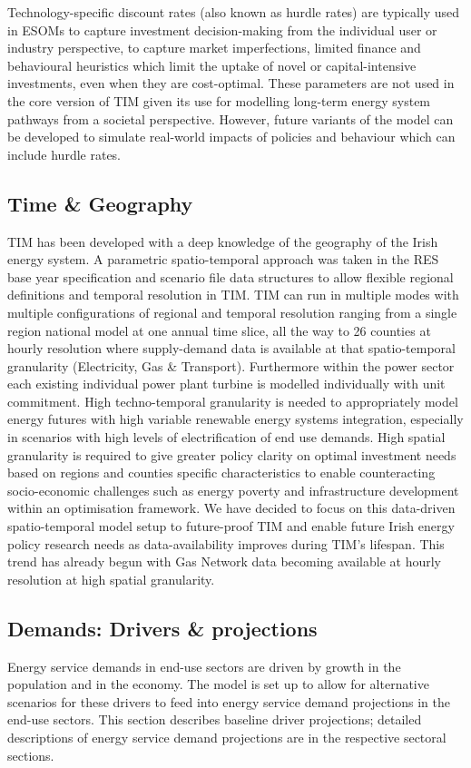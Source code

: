 \documentclass[gmd,manuscript]{copernicus}
\begin{document}
Technology-specific discount rates (also known as hurdle rates) are typically used in ESOMs to capture investment decision-making from the individual user or industry perspective, to capture market imperfections, limited finance and behavioural heuristics which limit the uptake of novel or capital-intensive investments, even when they are cost-optimal. These parameters are not used in the core version of TIM given its use for modelling long-term energy system pathways from a societal perspective. However, future variants of the model can be developed to simulate real-world impacts of policies and behaviour which can include hurdle rates. 

\subsection{Time \& Geography}
\label{ss:time_geo}
TIM has been developed with a deep knowledge of the geography of the Irish energy system. A parametric spatio-temporal approach was taken in the RES base year specification and scenario file data structures to allow flexible regional definitions and temporal resolution in TIM. TIM can run in multiple modes with multiple configurations of regional and temporal resolution ranging from a single region national model at one annual time slice, all the way to 26 counties at hourly resolution where supply-demand data is available at that spatio-temporal granularity (Electricity, Gas \& Transport). Furthermore within the power sector each existing individual power plant turbine is modelled individually with unit commitment. High techno-temporal granularity is needed to appropriately model energy futures with high variable renewable energy systems integration, especially in scenarios with high levels of electrification of end use demands. High spatial granularity is required to give greater policy clarity on optimal investment needs based on regions and counties specific characteristics to enable counteracting socio-economic challenges such as energy poverty and infrastructure development within an optimisation framework. We have decided to focus on this data-driven spatio-temporal model setup to future-proof TIM and enable future Irish energy policy research needs as data-availability improves during TIM's lifespan. This trend has already begun with Gas Network data becoming available at hourly resolution at high spatial granularity.

\subsection{Demands: Drivers \& projections}
\label{ss:model_proj}
Energy service demands in end-use sectors are driven by growth in the population and in the economy. The model is set up to allow for alternative scenarios for these drivers to feed into energy service demand projections in the end-use sectors. This section describes baseline driver projections; detailed descriptions of energy service demand projections are in the respective sectoral sections. 
\end{document}
